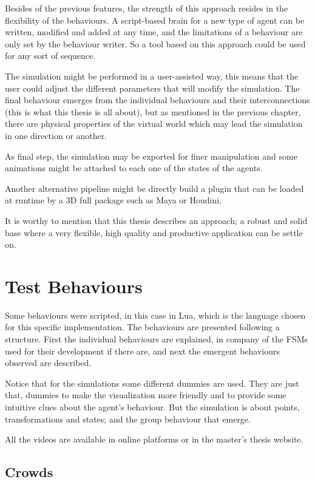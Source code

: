Besides of the previous features, the strength of this approach resides in the flexibility of the behaviours. A script-based brain for a new type of agent can be written, modified and added at any time, and the limitations of a behaviour are only set by the behaviour writer. So a tool based on this approach could be used for any sort of sequence.

The simulation might be performed in a user-assisted way, this means that the user could adjust the different parameters that will modify the simulation. The final behaviour emerges from the individual behaviours and their interconnections (this is what this thesis is all about), but as mentioned in the previous chapter, there are physical properties of the virtual world which may lead the simulation in one direction or another.

As final step, the simulation may be exported for finer manipulation and some animations might be attached to each one of the states of the agents.

Another alternative pipeline might be directly build a plugin that can be loaded at runtime by a 3D full package such as Maya or Houdini.

It is worthy to mention that this thesis describes an approach; a robust and solid base where a very flexible, high quality and productive application can be settle on.

\section{Test Behaviours}

Some behaviours were scripted, in this case in Lua, which is the language chosen for this specific implementation. The behaviours are presented following a structure. First the individual behaviours are explained, in company of the FSMs used for their development if there are, and next the emergent behaviours observed are described.

Notice that for the simulations some different dummies are used. They are just that, dummies to make the visualization more friendly and to provide some intuitive clues about the agent's behaviour. But the simulation is about points, transformations and states; and the group behaviour that emerge.

All the videos are available in online platforms or in the master's thesis website.

\subsection{Crowds}

